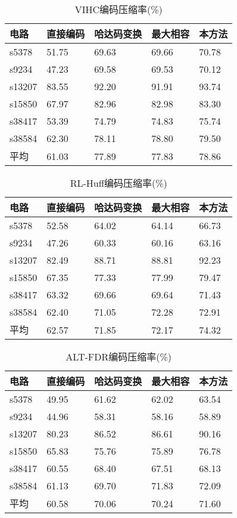\begin{table}[H]
\centering
\caption{VIHC编码压缩率(\%)}\label{mtabl4}
\begin{tabular}{p{2.2cm}p{2.7cm}<{\centering}p{3.3cm}<{\centering}p{2.7cm}<{\centering}p{2.7cm}<{\centering}}
\toprule
\textbf{电路}&	\textbf{直接编码}& \textbf{哈达码变换}& \textbf{最大相容}& \textbf{本方法}\\
\midrule
s5378&	51.75&	69.63&	69.66&	70.78\\
s9234&	47.23&	69.58&	69.53&	70.12\\
s13207&	83.55&	92.20&	91.91&	93.74\\
s15850&	67.97&	82.96&	82.98&	83.30\\
s38417&	53.39&	74.79&	74.83&	75.74\\
s38584&	62.30&	78.11&	78.80&	79.50\\
平均&	61.03&	77.89&	77.83&	78.86\\
\bottomrule
\end{tabular}
\end{table}

\begin{table}[H]
\centering
\caption{RL-Huff编码压缩率(\%)}\label{mtabl5}
\begin{tabular}{p{2.2cm}p{2.7cm}<{\centering}p{3.3cm}<{\centering}p{2.7cm}<{\centering}p{2.7cm}<{\centering}}
\toprule
\textbf{电路}&	\textbf{直接编码}& \textbf{哈达码变换}& \textbf{最大相容}& \textbf{本方法}\\
\midrule
s5378&	52.58&	64.02&	64.14&	66.73\\
s9234&	47.26&	60.33&	60.16&	63.16\\
s13207&	82.49&	88.71&	88.81&	92.23\\
s15850&	67.35&	77.33&	77.99&	79.47\\
s38417&	63.32&	69.66&	69.64&	71.43\\
s38584&	62.40&	71.05&	72.28&	72.91\\
平均&	62.57&	71.85&	72.17&	74.32\\
\bottomrule
\end{tabular}
\end{table}

\begin{table}[H]
\centering
\caption{ALT-FDR编码压缩率(\%)}\label{mtabl6}
\begin{tabular}{p{2.2cm}p{2.7cm}<{\centering}p{3.3cm}<{\centering}p{2.7cm}<{\centering}p{2.7cm}<{\centering}}
\toprule
\textbf{电路}&	\textbf{直接编码}& \textbf{哈达码变换}& \textbf{最大相容}& \textbf{本方法}\\
\midrule
s5378&	49.95&	61.62&	62.02&	63.54\\
s9234&	44.96&	58.31&	58.16&	58.89\\
s13207&	80.23&	86.52&	86.61&	90.16\\
s15850&	65.83&	75.76&	75.89&	76.78\\
s38417&	60.55&	68.40&	67.51&	68.13\\
s38584&	61.13&	69.70&	71.83&	72.09\\
平均&	60.58&	70.06&	70.24&	71.60\\
\bottomrule
\end{tabular}
\end{table}

